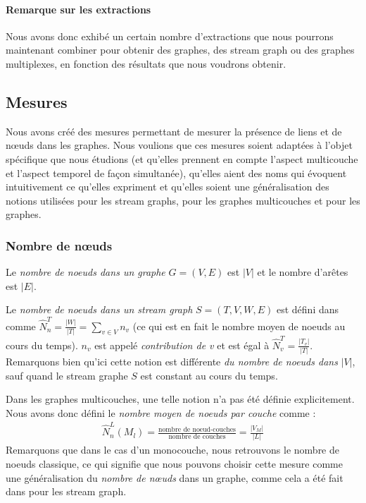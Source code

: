 \documentclass[11pt,a4paper]{article}
\theoremstyle{definition}
\theoremstyle{remark}
\theoremstyle{remark}
\def \stg {stream graph}
\begin{document}
\paragraph{Remarque sur les extractions}
Nous avons donc exhibé un certain nombre d'extractions que nous pourrons maintenant combiner pour obtenir des graphes, des \stg{} ou des graphes multiplexes, en fonction des résultats que nous voudrons obtenir.

\subsection{Mesures}


Nous avons créé des mesures permettant de mesurer la présence de liens et de nœuds dans les graphes. Nous voulions que ces mesures soient adaptées à l'objet spécifique que nous étudions (et qu'elles prennent en compte l'aspect multicouche et l'aspect temporel de façon simultanée), qu'elles aient des noms qui évoquent intuitivement ce qu'elles expriment et qu'elles soient une généralisation des notions utilisées pour les stream graphs, pour les graphes multicouches et pour les graphes.

	\subsubsection{Nombre de nœuds}
	Le {\em nombre de noeuds dans un graphe} $G=(V,E)$ est $|V|$ et le nombre d'arêtes est $|E|$.
	
	Le {\em nombre de noeuds dans un \stg{}} $S=(T,V,W,E)$ est défini dans \cite{stream} comme $\hat{N}^T_n=\frac{|W|}{|T|}=\sum_{v\in V} n_v$ (ce qui est en fait le nombre moyen de noeuds au cours du temps). $n_v$ est appelé {\em contribution de v} et est égal à $\hat{N}^T_v=\frac{|T_v|}{|T|}$. Remarquons bien qu'ici cette notion est différente {\em du nombre de noeuds dans} $|V|$, sauf quand le stream graphe $S$ est constant au cours du temps.
	\newline
	
	Dans les graphes multicouches, une telle notion n'a pas été définie explicitement.
	Nous avons donc défini le {\em nombre moyen de noeuds par couche} comme :
	\begin{align*}
		\hat{N}_n^L(M_l) = \frac{\text{nombre de noeud-couches}}{\text{nombre de couches}}=\frac{|V_M|}{|L|}
	\end{align*}	    
	Remarquons que dans le cas d'un monocouche, nous retrouvons le nombre de noeuds classique, ce qui signifie que nous pouvons choisir cette mesure comme une généralisation du {\em nombre de nœuds} dans un graphe, comme cela a été fait dans \cite{stream} pour les \stg{}.
		
\end{document}
